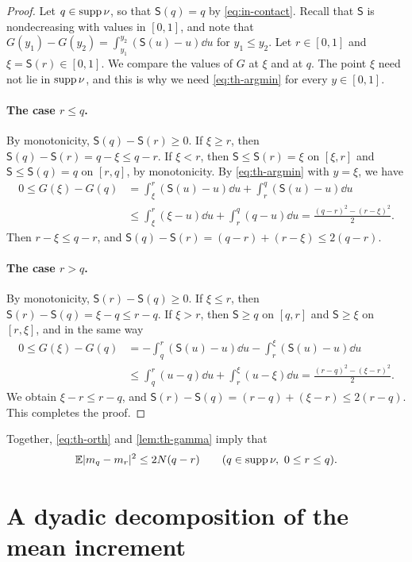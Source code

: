 \begin{proof}
Let $q\in\operatorname{supp}\nu$, so that $\mathsf S(q)=q$ by \eqref{eq:in-contact}.
Recall that $\mathsf S$ is nondecreasing with values in $[0,1]$, and
note that $G(y_1)-G(y_2)=\int_{y_1}^{y_2}(\mathsf S(u)-u)\dd u$ for
$y_1\le y_2$. Let $r\in[0,1]$ and $\xi=\mathsf S(r)\in[0,1]$. We compare
the values of $G$ at $\xi$ and at $q$. The point $\xi$ need not lie in
$\operatorname{supp}\nu$, and this is why we need \eqref{eq:th-argmin} for every
$y\in[0,1]$.

\paragraph{The case $r\le q$.}
By monotonicity, $\mathsf S(q)-\mathsf S(r)\ge0$. If $\xi\ge r$, then
$\mathsf S(q)-\mathsf S(r)=q-\xi\le q-r$. If $\xi<r$, then
$\mathsf S\le\mathsf S(r)=\xi$ on $[\xi,r]$ and
$\mathsf S\le\mathsf S(q)=q$ on $[r,q]$, by monotonicity. By
\eqref{eq:th-argmin} with $y=\xi$, we have
\[
 \begin{aligned}
 0\le G(\xi)-G(q)
 &=\int_\xi^r(\mathsf S(u)-u)\dd u+\int_r^q(\mathsf S(u)-u)\dd u\\
 &\le\int_\xi^r(\xi-u)\dd u+\int_r^q(q-u)\dd u
 =\frac{(q-r)^2-(r-\xi)^2}2 .
 \end{aligned}
\]
Then $r-\xi\le q-r$, and
$\mathsf S(q)-\mathsf S(r)=(q-r)+(r-\xi)\le2(q-r)$.

\paragraph{The case $r>q$.}
By monotonicity, $\mathsf S(r)-\mathsf S(q)\ge0$. If $\xi\le r$, then
$\mathsf S(r)-\mathsf S(q)=\xi-q\le r-q$. If $\xi>r$, then
$\mathsf S\ge q$ on $[q,r]$ and $\mathsf S\ge\xi$ on $[r,\xi]$, and in
the same way
\[
 \begin{aligned}
 0\le G(\xi)-G(q)
 &=-\int_q^r(\mathsf S(u)-u)\dd u-\int_r^\xi(\mathsf S(u)-u)\dd u\\
 &\le\int_q^r(u-q)\dd u+\int_r^\xi(u-\xi)\dd u
 =\frac{(r-q)^2-(\xi-r)^2}2 .
 \end{aligned}
\]
We obtain $\xi-r\le r-q$, and
$\mathsf S(r)-\mathsf S(q)=(r-q)+(\xi-r)\le2(r-q)$. This completes the
proof.
\end{proof}

Together, \eqref{eq:th-orth} and \cref{lem:th-gamma} imply that
\[
 \mathbb E|m_q-m_r|^2\le2N(q-r)\qquad(q\in\operatorname{supp}\nu,\ 0\le r\le q).
\]

\section{A dyadic decomposition of the mean increment}\label{sec:th-dyadic}


